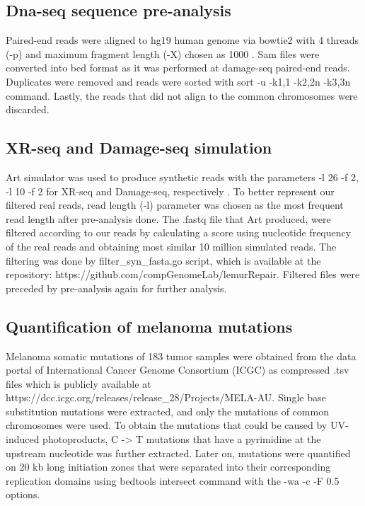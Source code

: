 \subsection{Dna-seq sequence pre-analysis}
Paired-end reads were aligned to hg19 human genome via bowtie2 with 4 threads (-p) and maximum fragment length (-X) chosen as 1000 \citep{langmead2012fast}. Sam files were converted into bed format as it was performed at damage-seq paired-end reads. Duplicates were removed and reads were sorted with sort -u -k1,1 -k2,2n -k3,3n command. Lastly, the reads that did not align to the common chromosomes were discarded.

\subsection{XR-seq and Damage-seq simulation}
Art simulator was used to produce synthetic reads with the parameters
-l 26 -f 2, -l 10 -f 2 for XR-seq and Damage-seq, respectively \citep{huang2012art}. To better represent our filtered real reads, read length (-l) parameter was chosen as the most frequent read length after pre-analysis done. The .fastq file that Art produced, were filtered according to our reads by calculating a score using nucleotide frequency of the real reads and obtaining most similar 10 million simulated reads. 
The filtering was done by filter\_syn\_fasta.go script, which is available at the repository: https://github.com/compGenomeLab/lemurRepair. 
Filtered files were preceded by pre-analysis again for further analysis.

\subsection{Quantification of melanoma mutations}
Melanoma somatic mutations of 183 tumor samples were obtained from the data portal of International Cancer Genome Consortium (ICGC) as compressed .tsv files which is publicly available at https://dcc.icgc.org/releases/release\_28/Projects/MELA-AU. Single base substitution mutations were extracted, and only the mutations of common chromosomes were used. To obtain the mutations that could be caused by UV-induced photoproducts, C -> T mutations that have a pyrimidine at the upstream nucleotide was further extracted. Later on, mutations were quantified on 20 kb long initiation zones that were separated into their corresponding replication domains using bedtools intersect command with the -wa -c -F 0.5 options.

